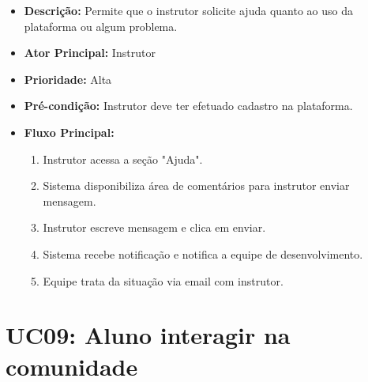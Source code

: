         \begin{itemize}
            \item \textbf{Descrição:} Permite que o instrutor solicite ajuda quanto ao uso da plataforma ou algum problema.
            
            \item \textbf{Ator Principal:} Instrutor
            
            \item \textbf{Prioridade:} Alta
            
            \item \textbf{Pré-condição:} Instrutor deve ter efetuado cadastro na plataforma.
            
            \item \textbf{Fluxo Principal:}
            \begin{enumerate}
                \item Instrutor acessa a seção "Ajuda".
                \item Sistema disponibiliza área de comentários para instrutor enviar mensagem.
                \item Instrutor escreve mensagem e clica em enviar.
                \item Sistema recebe notificação e notifica a equipe de desenvolvimento.
                \item Equipe trata da situação via email com instrutor.
            \end{enumerate}
        \end{itemize}

        \section*{UC09: Aluno interagir na comunidade}

